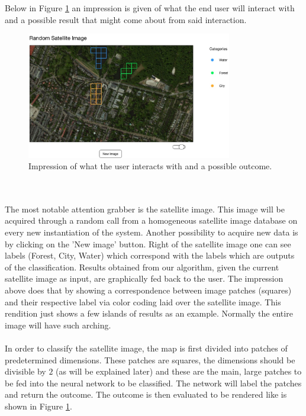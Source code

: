 \documentclass[a4paper,onecolumn]{report}
\begin{document}
Below in Figure \ref{fig:impression} an impression is given of what the end user will interact with and a possible result that might come about from said interaction.\\
\begin{figure}[h!]
    \centering
    \includegraphics[width=0.8\textwidth]{./images/impression_toggle.jpg}
    \caption{Impression of what the user interacts with and a possible outcome.}
	\label{fig:impression}
\end{figure}
\\\\
The most notable attention grabber is the satellite image. This image will be acquired through a random call from a homogeneous satellite image database on every new instantiation of the system. Another possibility to acquire new data is by clicking on the 'New image' button. Right of the satellite image one can see labels (Forest, City, Water) which correspond with the labels which are outputs of the classification. Results obtained from our algorithm, given the current satellite image as input, are graphically fed back to the user. The impression above does that by showing a correspondence between image patches (squares) and their respective label via color coding laid over the satellite image. This rendition just shows a few islands of results as an example. Normally the entire image will have such arching.
\\\\
In order to classify the satellite image, the map is first divided into patches of predetermined dimensions. These patches are squares, the dimensions should be divisible by $2$ (as will be explained later) and these are the main, large patches to be fed into the neural network to be classified. The network will label the patches and return the outcome. The outcome is then evaluated to be rendered like is shown in Figure \ref{fig:impression}.
\\\\
\end{document}
